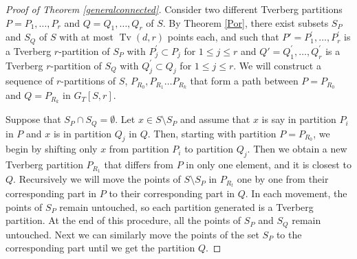 \documentclass[11pt,a4paper]{article}
\theoremstyle{plain}
\theoremstyle{definition}
\newcommand{\tv}{\operatorname{Tv}}
\begin{document}
 
 \begin{proof}[Proof of Theorem \ref{generalconnected}]
Consider two different Tverberg partitions $P= P_1,\dots,P_r $ and $Q=Q_1,\dots,Q_r$ of $S$. By Theorem \ref{Por}, there exist subsets $S_P$ and $S_Q$ of $S$ with at most $\tv (d,r)$ points each, and such that $P'=P_1^\prime,\dots ,P_r^\prime$ is a Tverberg $r$-partition of $S_P$ with $P_j^\prime \subset P_j$ for $1\leq j \leq r$ and $Q'=Q_1^\prime,\dots ,Q_r^\prime$ is a Tverberg $r$-partition of $S_Q$ with $Q_j^\prime \subset Q_j$ for $1\leq j \leq r$.
We will construct a sequence of $r$-partitions of $S$, $P_{R_0},P_{R_1}\dots P_{R_k}$ that form a path between $P=P_{R_0}$ and $Q=P_{R_k}$ in $G_T[S,r]$.


Suppose that $S_P\cap S_Q = \emptyset$.  Let $x\in S\setminus S_P$ and assume that $x$ is say in partition $P_i$ in $P$ and $x$ is in partition $Q_j$ in $Q$. Then, starting with partition $P=P_{R_0}$, we begin by shifting only $x$ from partition $P_i$ to  partition $Q_j$. Then we obtain a new Tverberg partition $P_{R_1}$ that differs from $P$ in only one element, and it is closest to $Q$. Recursively we will move the points of $S\setminus S_P$ in $P_{R_t}$ one by one  from their corresponding part in $P$ to their corresponding part in $Q$. 
In each movement, the points of $S_P$ remain untouched, so each partition generated is a Tverberg partition. At the end of this procedure, all the points of $S_P$ and $S_Q$ remain untouched. Next we can similarly move the points of the set $S_P$ to the corresponding part until we get the partition $Q$.



\end{proof}
\end{document}
